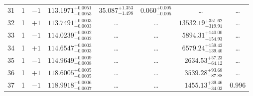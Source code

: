 \begin{table*}[!]
\begin{tabular}{llcrrlrc}
31 & 1 & $-1$ & $    113.1971_{-      0.0053}^{+      0.0051}$ & $      35.087_{-       1.498}^{+       1.353}$ & $       0.060_{-       0.005}^{+       0.005}$ & \multicolumn{1}{c}{\dots} & \dots \\[1pt]
32 & 1 & $+1$ & $    113.7491_{-      0.0003}^{+      0.0003}$ & \multicolumn{1}{c}{\dots} & \multicolumn{1}{c}{\dots} & $    13532.19_{-      319.91}^{+      351.62}$ & \dots\\[1pt]
33 & 1 & $-1$ & $    114.0239_{-      0.0002}^{+      0.0002}$ & \multicolumn{1}{c}{\dots} & \multicolumn{1}{c}{\dots} & $     5894.31_{-      154.93}^{+      140.00}$ & \dots\\[1pt]
34 & 1 & $+1$ & $    114.6547_{-      0.0003}^{+      0.0003}$ & \multicolumn{1}{c}{\dots} & \multicolumn{1}{c}{\dots} & $     6579.24_{-      139.40}^{+      159.42}$ & \dots\\[1pt]
35 & 1 & $-1$ & $    114.9649_{-      0.0008}^{+      0.0009}$ & \multicolumn{1}{c}{\dots} & \multicolumn{1}{c}{\dots} & $     2634.53_{-       64.12}^{+       57.23}$ & \dots\\[1pt]
36 & 1 & $+1$ & $    118.6005_{-      0.0005}^{+      0.0005}$ & \multicolumn{1}{c}{\dots} & \multicolumn{1}{c}{\dots} & $     3539.28_{-       87.88}^{+       93.68}$ & \dots\\[1pt]
37 & 1 & $-1$ & $    118.9918_{-      0.0007}^{+      0.0006}$ & \multicolumn{1}{c}{\dots} & \multicolumn{1}{c}{\dots} & $     1455.13_{-       34.03}^{+       39.46}$ & 0.996\\[1pt]


\end{tabular}
\end{table*}
